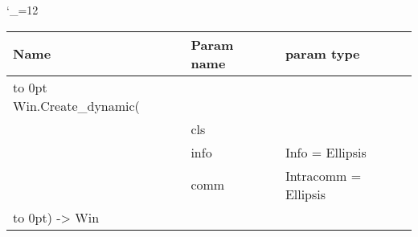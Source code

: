 \begingroup \catcode`\_=12 \tt
\begin{tabular}{lll}
\toprule
\textrm{Name}&\textrm{Param name}&\textrm{param type}\\
\midrule
\hbox to 0pt {Win.Create_dynamic(\hss}\\
& cls\\
& info & Info = Ellipsis\\
& comm & Intracomm = Ellipsis\\
\hbox to 0pt{) -> Win\hss}\\
\bottomrule
\end{tabular}
\endgroup
